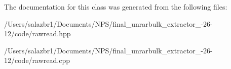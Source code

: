 The documentation for this class was generated from the following files\-:\begin{DoxyCompactItemize}
\item 
/\-Users/salazbr1/\-Documents/\-N\-P\-S/final\-\_\-unrarbulk\-\_\-extractor\-\_-\/26-\/12/code/rawread.\-hpp\item 
/\-Users/salazbr1/\-Documents/\-N\-P\-S/final\-\_\-unrarbulk\-\_\-extractor\-\_-\/26-\/12/code/rawread.\-cpp\end{DoxyCompactItemize}
